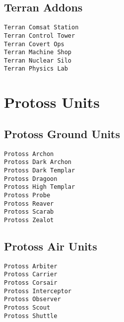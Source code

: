 \subsection{Terran Addons}
\verb|Terran Comsat Station| \\
\verb|Terran Control Tower| \\
\verb|Terran Covert Ops| \\
\verb|Terran Machine Shop| \\
\verb|Terran Nuclear Silo| \\
\verb|Terran Physics Lab|

\section{Protoss Units}

\subsection{Protoss Ground Units}
\verb|Protoss Archon| \\
\verb|Protoss Dark Archon| \\
\verb|Protoss Dark Templar| \\
\verb|Protoss Dragoon| \\
\verb|Protoss High Templar| \\
\verb|Protoss Probe| \\
\verb|Protoss Reaver| \\
\verb|Protoss Scarab| \\
\verb|Protoss Zealot|

\subsection{Protoss Air Units}
\verb|Protoss Arbiter| \\
\verb|Protoss Carrier| \\
\verb|Protoss Corsair| \\
\verb|Protoss Interceptor| \\
\verb|Protoss Observer| \\
\verb|Protoss Scout| \\
\verb|Protoss Shuttle|

